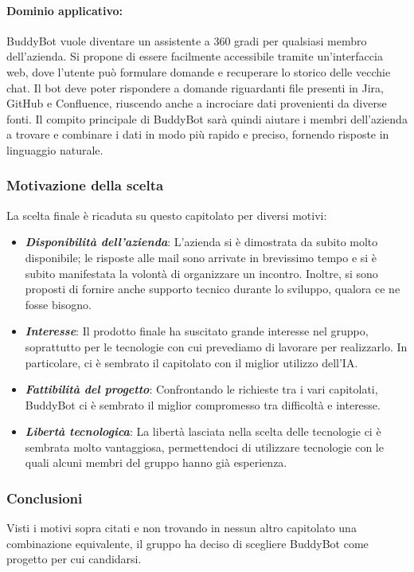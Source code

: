 \paragraph{Dominio applicativo:}
BuddyBot vuole diventare un assistente a 360 gradi per qualsiasi membro 
dell'azienda. Si propone di essere facilmente accessibile tramite
un'interfaccia web, dove l'utente può formulare domande e recuperare lo storico delle vecchie chat.
Il bot deve poter rispondere a domande riguardanti file presenti in Jira, GitHub e Confluence, 
riuscendo anche a incrociare dati provenienti da diverse fonti. Il compito principale di 
BuddyBot sarà quindi aiutare i membri dell'azienda a trovare e combinare i dati in 
modo più rapido e preciso, fornendo risposte in linguaggio naturale.

\subsubsection{Motivazione della scelta}
La scelta finale è ricaduta su questo capitolato per diversi motivi:
\begin{itemize}
    \item \textit{\textbf{Disponibilità dell'azienda}}: L'azienda si è dimostrata da subito molto disponibile; le risposte alle mail sono arrivate in brevissimo tempo e si è subito manifestata la volontà di organizzare un incontro. Inoltre, si sono proposti di fornire anche supporto tecnico durante lo sviluppo, qualora ce ne fosse bisogno.
    \item \textit{\textbf{Interesse}}: Il prodotto finale ha suscitato grande interesse nel gruppo, soprattutto per le tecnologie con cui prevediamo di lavorare per realizzarlo. In particolare, ci è sembrato il capitolato con il miglior utilizzo dell'IA.
    \item \textit{\textbf{Fattibilità del progetto}}: Confrontando le richieste tra i vari capitolati, BuddyBot ci è sembrato il miglior compromesso tra difficoltà e interesse.
    \item \textit{\textbf{Libertà tecnologica}}: La libertà lasciata nella scelta delle tecnologie ci è sembrata molto vantaggiosa, permettendoci di utilizzare tecnologie con le quali alcuni membri del gruppo hanno già esperienza.
\end{itemize}

\subsubsection{Conclusioni}
Visti i motivi sopra citati e non trovando in nessun altro capitolato una combinazione equivalente, 
il gruppo ha deciso di scegliere BuddyBot come progetto per cui candidarsi.

